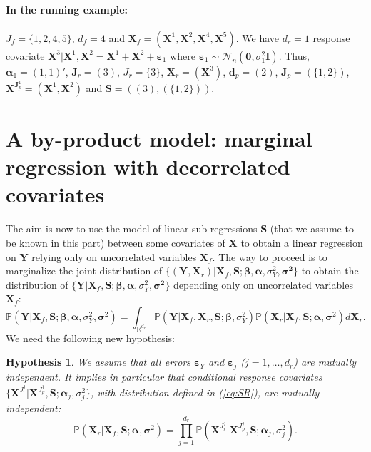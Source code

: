 \documentclass[12pt,a4paper]{report}
\newtheorem{hyp}{Hypothesis}
\begin{document}
	 
\paragraph{In the running example:}$J_f=\{1,2,4,5\}$, $d_f=4$ and $\boldsymbol{X}_f=(\boldsymbol{X}^1,\boldsymbol{X}^2,\boldsymbol{X}^4,\boldsymbol{X}^5)$. We have $d_r=1$ response covariate $\boldsymbol{X}^3|\boldsymbol{X}^1,\boldsymbol{X}^2=\boldsymbol{X}^1+\boldsymbol{X}^2+\boldsymbol{\varepsilon}_1$ where $\boldsymbol{\varepsilon}_1\sim{\mathcal{N}_n(\boldsymbol{0},\sigma_1^2\boldsymbol{I})}$. Thus, $\boldsymbol{\alpha}_1=(1,1)'$, $\boldsymbol{J}_r=(3)$, $J_r=\{3\}$, $\boldsymbol{X}_r=(\boldsymbol{X}^3)$, $\boldsymbol{d}_p=(2)$, $\boldsymbol{J}_p=(\{1,2\})$, $\boldsymbol{X}^{\boldsymbol{J}_p^1}=(\boldsymbol{X}^1,\boldsymbol{X}^2)$ and $\boldsymbol{S}=((3),(\{1,2\}))$.  



\section{A by-product model: marginal regression with decorrelated covariates}
The aim is now to use the model of linear sub-regressions $\boldsymbol{S}$ (that we assume to be known in this part) between some covariates of $\boldsymbol{X}$ to obtain a linear regression on $\boldsymbol{Y}$ relying only on uncorrelated variables $\boldsymbol{X}_f$.  The way to proceed is to marginalize the joint distribution of $\{(\boldsymbol{Y},\boldsymbol{X}_r) |\boldsymbol{X}_f,\boldsymbol{S};\boldsymbol{\beta},\boldsymbol{\alpha},\sigma_Y^2,\boldsymbol{\sigma^2}\}$ to obtain the distribution of $\{\boldsymbol{Y} |\boldsymbol{X}_f,\boldsymbol{S};\boldsymbol{\beta},\boldsymbol{\alpha},\sigma_Y^2,\boldsymbol{\sigma^2}\}$ depending only on uncorrelated variables $\boldsymbol{X}_f$:
\begin{equation}\label{eq:marginal}
\mathbb{P}(\boldsymbol{Y} |\boldsymbol{X}_f,\boldsymbol{S};\boldsymbol{\beta},\boldsymbol{\alpha},\sigma_Y^2,\boldsymbol{\sigma}^2) = \int_{{\mathbb{R}^{d_r}}}\mathbb{P}(\boldsymbol{Y}| \boldsymbol{X}_f,\boldsymbol{X}_r,\boldsymbol{S};\boldsymbol{\beta},\sigma_Y^2) \mathbb{P}(\boldsymbol{X}_r | \boldsymbol{X}_f,\boldsymbol{S};\boldsymbol{\alpha},\boldsymbol{\sigma}^2) d\boldsymbol{X}_r.
\end{equation}
We need the following new hypothesis:

\begin{hyp}\label{H3}
We assume that all errors $\boldsymbol{\varepsilon}_Y$ and $\boldsymbol{\varepsilon}_j$ ($j=1,\ldots,d_r$) are {\it mutually independent}. It implies in particular that conditional response covariates $\{\boldsymbol{X}^{J_{r}^j}|\boldsymbol{X}^{J_{p}^j},\boldsymbol{S};\boldsymbol{\alpha}_j,\sigma^2_j\}$, with distribution defined in (\ref{eq:SR}), are {\it mutually independent}:
\begin{equation}\label{eq:H3}
\mathbb{P}(\boldsymbol{X}_r | \boldsymbol{X}_f,\boldsymbol{S};\boldsymbol{\alpha},\boldsymbol{\sigma}^2) = \prod_{j=1}^{d_r} \mathbb{P}(\boldsymbol{X}^{J_{r}^j}|\boldsymbol{X}^{J_{p}^j},\boldsymbol{S};\boldsymbol{\alpha}_j,\sigma^2_j).
\end{equation}
\end{hyp}
\end{document}

